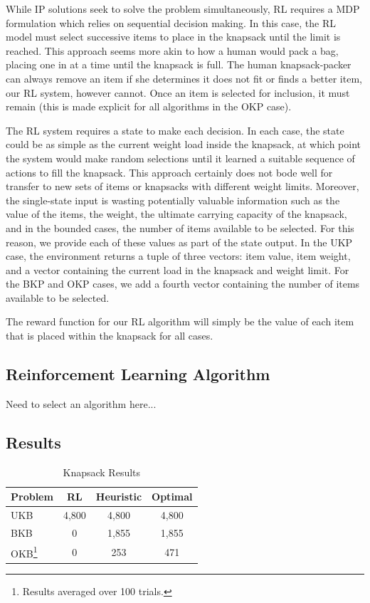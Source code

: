 \documentclass[12pt]{article}
\newcommand{\ra}[1]{\renewcommand{\arraystretch}{#1}}
\begin{document}
While IP solutions seek to solve the problem simultaneously, RL requires a MDP formulation which relies on sequential decision making.
In this case, the RL model must select successive items to place in the knapsack until the limit is reached.
This approach seems more akin to how a human would pack a bag, placing one in at a time until the knapsack is full.
The human knapsack-packer can always remove an item if she determines it does not fit or finds a better item, our RL system, however cannot.
Once an item is selected for inclusion, it must remain (this is made explicit for all algorithms in the OKP case).

The RL system requires a state to make each decision.
In each case, the state could be as simple as the current weight load inside the knapsack, at which point the system would make random selections until it learned a suitable sequence of actions to fill the knapsack.
This approach certainly does not bode well for transfer to new sets of items or knapsacks with different weight limits.
Moreover, the single-state input is wasting potentially valuable information such as the value of the items, the weight, the ultimate carrying capacity of the knapsack, and in the bounded cases, the number of items available to be selected.
For this reason, we provide each of these values as part of the state output.
In the UKP case, the environment returns a tuple of three vectors: item value, item weight, and a vector containing the current load in the knapsack and weight limit.
For the BKP and OKP cases, we add a fourth vector containing the number of items available to be selected.

The reward function for our RL algorithm will simply be the value of each item that is placed within the knapsack for all cases.

\subsection{Reinforcement Learning Algorithm}

Need to select an algorithm here...

\subsection{Results}

\begin{table}
\centering
\caption{Knapsack Results}
\ra{1.3}
\begin{tabular}{@{}lccc@{}}\toprule
Problem & RL & Heuristic & Optimal \\
\midrule
UKB & 4,800 & 4,800 & 4,800 \\
BKB & 0 & 1,855 & 1,855 \\
OKB\footnote{Results averaged over 100 trials.} & 0 & 253 & 471 \\
\bottomrule
\end{tabular}
\label{tab:kp_results}
\end{table}
\end{document}
